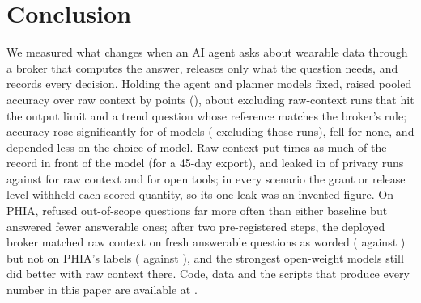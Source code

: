 \section{Conclusion}\label{sec:conclusion}

We measured what changes when an AI agent asks about wearable data through a broker that computes the answer,
releases only what the question needs, and records every decision. Holding the agent and planner models fixed,
\sys{} raised pooled accuracy over raw context by \bootPooledCAEst{} points (\bootPooledCACI{}), about
\sensCapHrvEst{} excluding raw-context runs that hit the output limit and a trend question whose reference matches the
broker's rule; accuracy rose significantly for \nSigCA{} of \nTestedCA{} models (\sensCapNSig{} excluding those runs),
fell for none, and depended less on the choice of model. Raw context put \expRatioAC{} times as much of the record in
front of the model (for a 45-day export), and \sys{} leaked in \leakPooledC{} of privacy runs against \leakPooledA{}
for raw context and \leakPooledB{} for open tools; in every scenario the grant or release level withheld each scored
quantity, so its one leak was an invented figure. On PHIA, \sys{} refused out-of-scope questions far more often than
either baseline but answered fewer answerable ones; after two pre-registered steps, the deployed broker matched raw
context on fresh answerable questions as worded (\vthreePhiaWordedThree{} against \vthreePhiaWordedA{}) but not on
PHIA's labels (\vthreePhiaLabelThree{} against \vthreePhiaLabelA{}), and the strongest open-weight models still did
better with raw context there. Code, data and the scripts that produce every number in this paper are available at
\codeurl{}.
